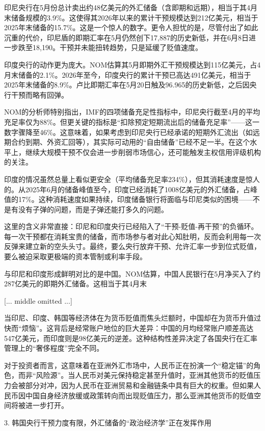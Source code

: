 \documentclass[11pt]{ctexart}
\begin{document}
印尼央行在5月份总计卖出约48亿美元的外汇储备（含即期和远期），相当于其4月末储备规模的3.9\%。这使得其2026年以来的累计干预规模达到212亿美元，相当于2025年末储备的15.7\%。这是一个惊人的数字。更令人担忧的是，尽管付出了如此沉重的代价，印尼盾的即期汇率在5月仍然创下17,887的历史新低，并在6月8日进一步跌至18,190。干预并未能扭转趋势，只是延缓了贬值速度。

印度央行的动作更为庞大。NOM估算其5月即期外汇干预规模达到115亿美元，占4月末储备的2.1\%。2026年至今，印度央行的累计干预已高达491亿美元，相当于2025年末储备的8.9\%。卢比即期汇率在5月20日触及96.965的历史新低，之后因央行干预而略有回弹。

NOM的分析师特别指出，IMF的四项储备充足性指标中，印尼央行截至4月的平均充足率仅为88\%。但更关键的指标是“扣除预定短期流出后的储备充足率”——这一数字骤降至46\%。这意味着，如果考虑到印尼央行已经承诺的短期外汇流出（如远期合约到期、外资汇回等），其实际可动用的“自由储备”已经不足一半。在这个水平上，继续大规模干预不仅会进一步削弱市场信心，还可能触发主权信用评级机构的关注。

印度的情况虽然总量上看似更安全（平均储备充足率234\%），但其消耗速度是惊人的。从2025年6月的储备峰值至今，印度已经消耗了1008亿美元的外汇储备，占峰值的17\%。这种消耗速度如果持续，印度储备银行将面临与印尼类似的困境——不是有没有子弹的问题，而是子弹还能打多久的问题。

这里的含义非常直接：印尼和印度央行已经陷入了“干预-贬值-再干预”的负循环。每一次干预都在消耗宝贵的储备，而市场参与者对此心知肚明，反而会利用每一次反弹来建立新的空头头寸。最终，要么央行放弃干预、允许汇率一步到位式贬值，要么被迫采取更极端的资本管制或利率手段。

与印尼和印度形成鲜明对比的是中国。NOM估算，中国人民银行在5月净买入了约287亿美元的即期外汇储备。这相当于其4月末

[... middle omitted ...]

当印尼、印度、韩国等经济体在为货币贬值而焦头烂额时，中国却在为货币升值过快而“烦恼”。这背后是经常账户地位的巨大差异：中国的月均经常账户顺差高达547亿美元，而印度则是98亿美元的逆差。这种结构性差异决定了各国央行在汇率管理上的“奢侈程度”完全不同。

对于投资者而言，这意味着在亚洲外汇市场中，人民币正在扮演一个“稳定锚”的角色，而非“风险源”。当人民币对美元保持稳定甚至升值时，亚洲其他货币的贬值压力会被部分对冲，因为人民币在亚洲贸易和金融链条中具有巨大的权重。但如果人民币因中国自身经济放缓或政策转向而出现贬值压力，那么亚洲其他货币的贬值空间将被进一步打开。

3. 韩国央行干预力度有限，外汇储备的“政治经济学”正在发挥作用
\end{document}
